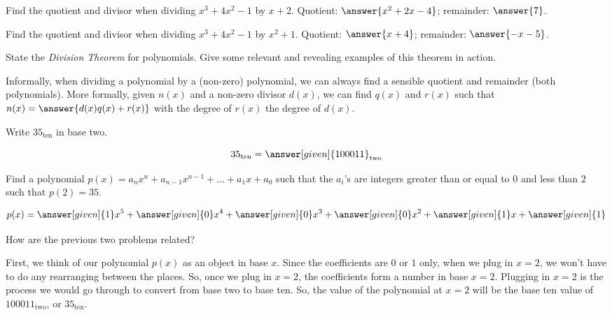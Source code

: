 \documentclass[nooutcomes]{ximera}
\begin{document}
\begin{problem}
Find the quotient and divisor when dividing $x^3+4x^2-1$ by $x+2$.  
Quotient: $\answer{x^2+2x-4}$; remainder: $\answer{7}$. 
\end{problem}

\begin{problem}
Find the quotient and divisor when dividing $x^3+4x^2-1$ by $x^2+1$.  
Quotient: $\answer{x+4}$; remainder: $\answer{-x-5}$. 
\end{problem}


\begin{problem}State the \textit{Division Theorem} for polynomials. Give some
  relevant and revealing examples of this theorem in action.
\begin{freeResponse}
\begin{hint}
Informally, when dividing a polynomial by a (non-zero) polynomial, we can always find a sensible quotient and remainder (both polynomials).  More formally, given $n(x)$ and a non-zero divisor $d(x)$, we can find $q(x)$ and $r(x)$ such that $n(x) = \answer{d(x)q(x)+r(x)}$ with the degree of $r(x)$  the degree of $d(x)$.  
\end{hint}
\end{freeResponse}
\end{problem} 



\begin{problem}
Write $35_{\text{ten}}$ in base two.
\begin{prompt}
\[
35_{\text{ten}} = \answer[given]{100011}_{\text{two}}
\]
\end{prompt}
	\begin{problem}
		Find a polynomial $p(x) = a_nx^n + a_{n-1}x^{n-1} + \dots + a_1 x + a_0$ such that the $a_i$'s are integers greater than or equal to $0$ and less than $2$ such that $p(2) = 35$.
		\begin{prompt}
			\[
			p(x) = \answer[given]{1}x^5 + \answer[given]{0}x^4 + \answer[given]{0}x^3 + \answer[given]{0}x^2 + \answer[given]{1}x + \answer[given]{1}
			\]
		\end{prompt}
		\begin{problem}
			How are the previous two problems related?
			\begin{freeResponse}
			\begin{hint}
				First, we think of our polynomial $p(x)$ as an object in base $x$.  Since the coefficients are $0$ or $1$ only, when we plug in $x=2$, we won't have to do any rearranging between the places.  So, once we plug in $x=2$, the coefficients form a number in base $x=2$.  Plugging in $x=2$ is the process we would go through to convert from base two to base ten.  So, the value of the polynomial at $x=2$ will be the base ten value of $100011_{\text{two}}$, or $35_{\text{ten}}$.
			\end{hint}
			\end{freeResponse}
		\end{problem}
	\end{problem}
\end{problem}
\end{document}
